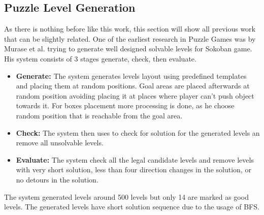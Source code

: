 \subsection{Puzzle Level Generation}
As there is nothing before like this work, this section will show all previous work that can be slightly related. One of the earliest research in Puzzle Games was by Murase et al.\cite{sokobanLevelGenerationOld} trying to generate well designed solvable levels for Sokoban game. His system consists of 3 stages generate, check, then evaluate.
\begin{itemize} \itemsep0pt \parskip0pt 
	\item \textbf{Generate:} The system generates levels layout using predefined templates and placing them at random positions. Goal areas are placed afterwards at random position avoiding placing it at places where player can't push object towards it. For boxes placement more processing is done, as he choose random position that is reachable from the goal area.
	\item \textbf{Check:} The system then uses  to check for solution for the generated levels an remove all unsolvable levels.
	\item \textbf{Evaluate:} The system check all the legal candidate levels and remove levels with very short solution, less than four direction changes in the solution, or no detours in the solution.
\end{itemize}
The system generated levels around 500 levels but only 14 are marked as good levels. The generated levels have short solution sequence due to the usage of BFS.\\\par

